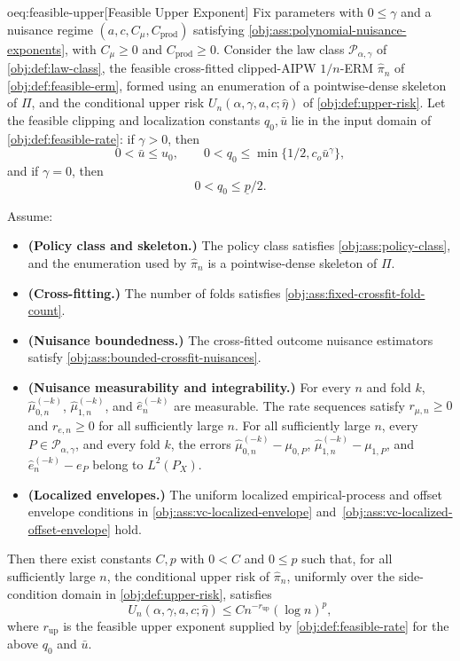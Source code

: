 \begin{theoremv}{oeq:feasible-upper}[Feasible Upper Exponent]
Fix parameters with \(0\le \gamma\) and a nuisance regime \((a,c,C_\mu,C_{\mathrm{prod}})\) satisfying \cref{obj:ass:polynomial-nuisance-exponents}, with \(C_\mu\ge0\) and \(C_{\mathrm{prod}}\ge0\). Consider the law class \(\mathcal P_{\alpha,\gamma}\) of \cref{obj:def:law-class}, the feasible cross-fitted clipped-AIPW \(1/n\)-ERM \(\widehat\pi_n\) of \cref{obj:def:feasible-erm}, formed using an enumeration of a pointwise-dense skeleton of \(\Pi\), and the conditional upper risk \(U_n(\alpha,\gamma,a,c;\widehat\eta)\) of \cref{obj:def:upper-risk}. Let the feasible clipping and localization constants \(q_0,\bar u\) lie in the input domain of \cref{obj:def:feasible-rate}: if \(\gamma>0\), then
\[
0<\bar u\le u_0,\qquad 0<q_0\le \min\{1/2,c_o\bar u^\gamma\},
\]
and if \(\gamma=0\), then
\[
0<q_0\le \underline p/2.
\]

Assume:
\begin{itemize}
\item \textbf{(Policy class and skeleton.)} The policy class satisfies \cref{obj:ass:policy-class}, and the enumeration used by \(\widehat\pi_n\) is a pointwise-dense skeleton of \(\Pi\).
\item \textbf{(Cross-fitting.)} The number of folds satisfies \cref{obj:ass:fixed-crossfit-fold-count}.
\item \textbf{(Nuisance boundedness.)} The cross-fitted outcome nuisance estimators satisfy \cref{obj:ass:bounded-crossfit-nuisances}.
\item \textbf{(Nuisance measurability and integrability.)} For every \(n\) and fold \(k\), \(\widehat\mu_{0,n}^{(-k)}\), \(\widehat\mu_{1,n}^{(-k)}\), and \(\widehat e_n^{(-k)}\) are measurable. The rate sequences satisfy \(r_{\mu,n}\ge0\) and \(r_{e,n}\ge0\) for all sufficiently large \(n\). For all sufficiently large \(n\), every \(P\in\mathcal P_{\alpha,\gamma}\), and every fold \(k\), the errors \(\widehat\mu_{0,n}^{(-k)}-\mu_{0,P}\), \(\widehat\mu_{1,n}^{(-k)}-\mu_{1,P}\), and \(\widehat e_n^{(-k)}-e_P\) belong to \(L^2(P_X)\).
\item \textbf{(Localized envelopes.)} The uniform localized empirical-process and offset envelope conditions in \cref{obj:ass:vc-localized-envelope} and~\cref{obj:ass:vc-localized-offset-envelope} hold.
\end{itemize}

Then there exist constants \(C,p\) with \(0<C\) and \(0\le p\) such that, for all sufficiently large \(n\), the conditional upper risk of \(\widehat\pi_n\), uniformly over the side-condition domain in \cref{obj:def:upper-risk}, satisfies
\[
U_n(\alpha,\gamma,a,c;\widehat\eta)\le C n^{-r_{\mathrm{up}}}(\log n)^p,
\]
where \(r_{\mathrm{up}}\) is the feasible upper exponent supplied by \cref{obj:def:feasible-rate} for the above \(q_0\) and \(\bar u\).
\end{theoremv}

